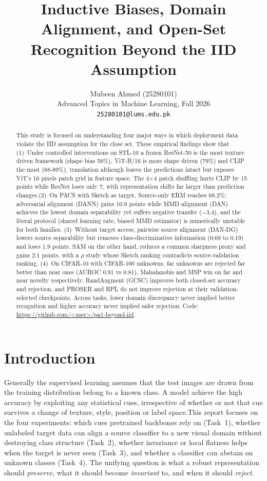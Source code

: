 \documentclass{article}
\title{Inductive Biases, Domain Alignment, and Open-Set Recognition Beyond the IID Assumption}
\author{%
  Mubeen Ahmed (25280101)\\
  Advanced Topics in Machine Learning, Fall 2026\\
  \texttt{25280101@lums.edu.pk}
}
\begin{document}
\maketitle

\begin{abstract}

This study is focused on understanding four major ways in which deployment data violate the IID assumption for the close set. These empirical findings show that (1)~Under controlled interventions on STL-10 a frozen ResNet-50 is the most texture driven framework (shape bias 58\%), ViT-B/16 is more shape driven (79\%) and CLIP the most (88-89\%), translation although leaves the predictions intact but exposes ViT's 16 pixels patch grid in feature space. The 4$\times$4 patch shuffling hurts CLIP by 15 points while ResNet loses only 7, with representation shifts far larger than prediction changes.(2)~On PACS with Sketch as target, Source-only ERM reaches 68.2\%; adversarial alignment (DANN) gains 10.9 points while MMD alignment (DAN) achieves the lowest domain separability yet suffers negative transfer ($-$3.4), and the literal protocol (shared learning rate, biased MMD estimator) is numerically unstable for both families. (3)~Without target access, pairwise source alignment (DAN-DG) lowers source separability but removes class-discriminative information (0.68 to 0.19) and loses 1.9 points.  SAM on the other hand, reduces a common sharpness proxy and gains 2.1 points, with a $\rho$ study whose Sketch ranking contradicts source-validation ranking. (4)~On CIFAR-10 with CIFAR-100 unknowns, far unknowns are rejected far better than near ones (AUROC 0.91 vs 0.81), Mahalanobis and MSP win on far and near novelty respectively. RandAugment (GCSC) improves both closed-set accuracy and rejection, and PROSER and RPL do not improve rejection at their validation-selected checkpoints. Across tasks, lower domain discrepancy never implied better recognition and higher accuracy never implied safer rejection.
Code: \url{https://github.com/<user>/pa1-beyond-iid}.
\end{abstract}




\section{Introduction}

Generally the supervised learning assumes that the test images are drawn from the training distribution belong to a known class. A model achieve the high accuracy by exploiting any statistical cues, irrespective of whether or not that cue survives a change of texture, style, position or label space.This report focuses on the four experiments: which cues
pretrained backbones rely on (Task~1), whether unlabeled target data can align a source classifier to a new visual domain without destroying class structure (Task~2), whether invariance or local flatness helps when the target is never seen (Task~3), and whether a classifier can abstain on unknown classes (Task~4). The unifying question is what a robust
representation should \emph{preserve}, what it should become \emph{invariant} to, and when it should \emph{reject}. 
\end{document}
